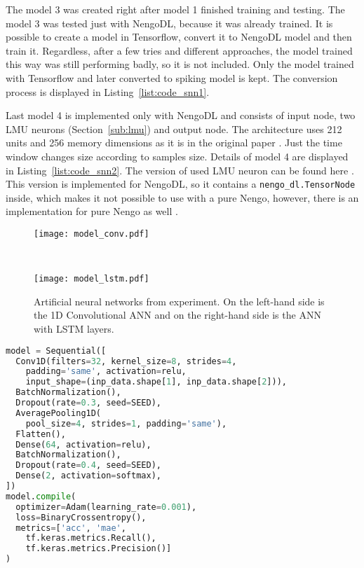 The model 3 was created right after model 1 finished training and testing. The model 3 was tested just with NengoDL, because it was already trained. It is possible to create a model in Tensorflow, convert it to NengoDL model and then train it. Regardless, after a few tries and different approaches, the model trained this way was still performing badly, so it is not included. Only the model trained with Tensorflow and later converted to spiking model is kept. The conversion process is displayed in Listing~\ref{list:code_snn1}.

Last model 4 is implemented only with NengoDL and consists of input node, two LMU neurons (Section~\ref{sub:lmu}) and output node. The architecture uses 212 units and 256 memory dimensions as it is in the original paper \cite{lmu-article}. Just the time window changes size according to samples size. Details of model 4 are displayed in Listing~\ref{list:code_snn2}. The version of used LMU neuron can be found here \cite{lmu-nengodl-doc}. This version is implemented for NengoDL, so it contains a \texttt{nengo\_dl.TensorNode} inside, which makes it not possible to use with a pure Nengo, however, there is an implementation for pure Nengo as well \cite{lmu-nengo-doc}.

\begin{figure}[ht!]
	\begin{minipage}{0.5\textwidth}
		\texttt{[image: model\_conv.pdf]}
	\end{minipage}
	~
	\begin{minipage}{0.5\textwidth}
		\texttt{[image: model\_lstm.pdf]}
	\end{minipage}
	\caption{Artificial neural networks from experiment. On the left-hand side is the 1D Convolutional ANN and on the right-hand side is the ANN with LSTM layers.}%
	\label{fig:arch_anns}
\end{figure}

\begin{lstlisting}[language=Python,label=list:code_ann1,caption=Implementation of 1D Convolutional ANN.,captionpos=b,frame=single,float]
model = Sequential([
  Conv1D(filters=32, kernel_size=8, strides=4,
    padding='same', activation=relu,
    input_shape=(inp_data.shape[1], inp_data.shape[2])),
  BatchNormalization(),
  Dropout(rate=0.3, seed=SEED),
  AveragePooling1D(
    pool_size=4, strides=1, padding='same'),
  Flatten(),
  Dense(64, activation=relu),
  BatchNormalization(),
  Dropout(rate=0.4, seed=SEED),
  Dense(2, activation=softmax),
])
model.compile(
  optimizer=Adam(learning_rate=0.001),
  loss=BinaryCrossentropy(),
  metrics=['acc', 'mae',
    tf.keras.metrics.Recall(),
    tf.keras.metrics.Precision()]
)
\end{lstlisting}

